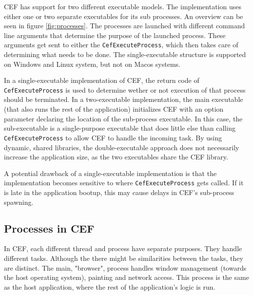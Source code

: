 CEF has support for two different executable models. The implementation uses either one or two separate executables for its sub processes. An overview can be seen in figure \ref{fig:processes}. The processes are launched with different command line arguments that determine the purpose of the launched process. These arguments get sent to either the \texttt{CefExecuteProcess}, which then takes care of determining what needs to be done. The single-executable structure is supported on Windows and Linux system, but not on Macos systems. \cite{cefusage}

In a single-executable implementation of CEF, the return code of \texttt{CefExecuteProcess} is used to determine wether or not execution of that process should be terminated. In a two-executable implementation, the main executable (that also runs the rest of the application) initializes CEF with an option parameter declaring the location of the sub-process executable. In this case, the sub-executable is a single-purpose executable that does little else than calling \texttt{CefExecuteProcess} to allow CEF to handle the incoming task. By using dynamic, shared libraries, the double-executable approach does not necessarily increase the application size, as the two executables share the CEF library.

A potential drawback of a single-executable implementation is that the implementation becomes sensitive to where \texttt{CefExecuteProcess} gets called. If it is late in the application bootup, this may cause delays in CEF's sub-process spawning.

\subsection{Processes in CEF}

In CEF, each different thread and process have separate purposes. They handle different tasks. Although the there might be similarities between the tasks, they are distinct. The main, "browser", process handles window management (towards the host operating system), painting and network access. This process is the same as the host application, where the rest of the application's logic is run.

